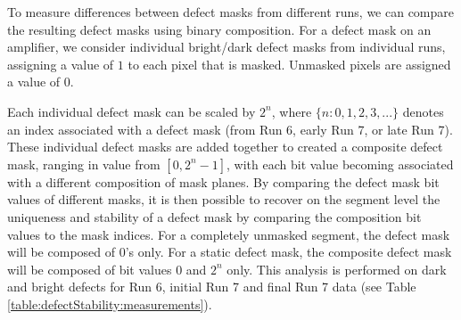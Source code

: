 To measure differences between defect masks from different runs, we can compare the resulting defect masks using binary composition. For a defect mask on an amplifier, we consider individual bright/dark defect masks from individual runs, assigning a value of $1$ to each pixel that is masked. Unmasked pixels are assigned a value of $0$.


Each individual defect mask can be scaled by $2^{n}$, where $\{n:0,1,2,3,... \}$ denotes an index associated with a defect mask (from Run 6, early Run 7, or late Run 7). These individual defect masks are added together to created a composite defect mask, ranging in value from $[0,2^{n}-1]$, with each bit value becoming associated with a different composition of mask planes. By comparing the defect mask bit values of different masks, it is then possible to recover on the segment level the uniqueness and stability of a defect mask by comparing the composition bit values to the mask indices. For a completely unmasked segment, the defect mask will be composed of 0's only. For a static defect mask, the composite defect mask will be composed of bit values 0 and $2^n$ only. This analysis is performed on dark and bright defects for Run 6, initial Run 7 and final Run 7 data (see Table \ref{table:defectStability:measurements}).

